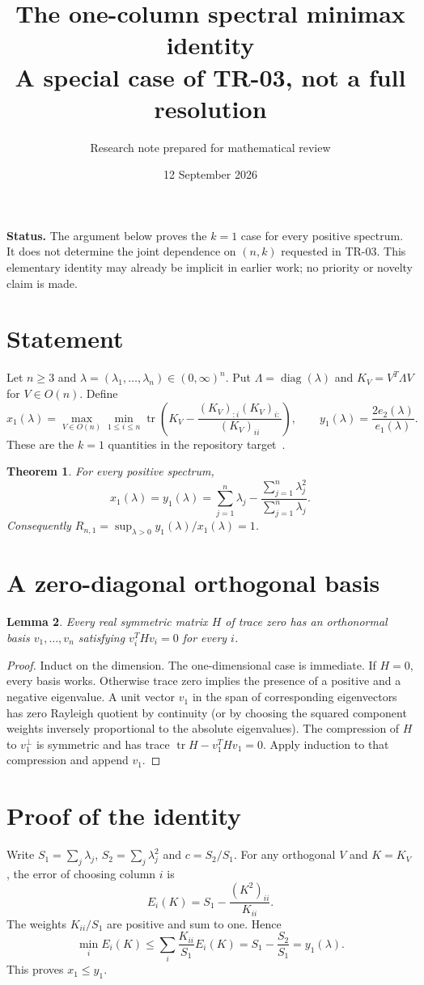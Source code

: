\documentclass[11pt]{article}
\title{The one-column spectral minimax identity\\[3pt]\large A special case of TR-03, not a full resolution}
\author{Research note prepared for mathematical review}
\date{12 September 2026}
\newtheorem{theorem}{Theorem}
\newtheorem{lemma}[theorem]{Lemma}
\newcommand{\tr}{\operatorname{tr}}
\newcommand{\diag}{\operatorname{diag}}
\begin{document}
\maketitle
\noindent\textbf{Status.} The argument below proves the $k=1$ case for every positive spectrum. It does not determine the joint dependence on $(n,k)$ requested in TR-03. This elementary identity may already be implicit in earlier work; no priority or novelty claim is made.

\section{Statement}
Let $n\ge3$ and $\lambda=(\lambda_1,\ldots,\lambda_n)\in(0,\infty)^n$. Put $\Lambda=\diag(\lambda)$ and $K_V=V^T\Lambda V$ for $V\in O(n)$. Define
\[
 x_1(\lambda)=\max_{V\in O(n)}\min_{1\le i\le n}
 \tr\left(K_V-\frac{(K_V)_{:i}(K_V)_{i:}}{(K_V)_{ii}}\right),
 \qquad y_1(\lambda)=\frac{2e_2(\lambda)}{e_1(\lambda)}.
\]
These are the $k=1$ quantities in the repository target~\cite{repo}.
\begin{theorem}
For every positive spectrum,
\[
 x_1(\lambda)=y_1(\lambda)
 =\sum_{j=1}^n\lambda_j-
   \frac{\sum_{j=1}^n\lambda_j^2}{\sum_{j=1}^n\lambda_j}.
\]
Consequently $R_{n,1}=\sup_{\lambda>0}y_1(\lambda)/x_1(\lambda)=1$.
\end{theorem}

\section{A zero-diagonal orthogonal basis}
\begin{lemma}
Every real symmetric matrix $H$ of trace zero has an orthonormal basis $v_1,\ldots,v_n$ satisfying $v_i^THv_i=0$ for every $i$.
\end{lemma}
\begin{proof}
Induct on the dimension. The one-dimensional case is immediate. If $H=0$, every basis works. Otherwise trace zero implies the presence of a positive and a negative eigenvalue. A unit vector $v_1$ in the span of corresponding eigenvectors has zero Rayleigh quotient by continuity (or by choosing the squared component weights inversely proportional to the absolute eigenvalues). The compression of $H$ to $v_1^\perp$ is symmetric and has trace $\tr H-v_1^THv_1=0$. Apply induction to that compression and append $v_1$.
\end{proof}

\section{Proof of the identity}
Write $S_1=\sum_j\lambda_j$, $S_2=\sum_j\lambda_j^2$ and $c=S_2/S_1$. For any orthogonal $V$ and $K=K_V$, the error of choosing column $i$ is
\[
 E_i(K)=S_1-\frac{(K^2)_{ii}}{K_{ii}}.
\]
The weights $K_{ii}/S_1$ are positive and sum to one. Hence
\[
 \min_i E_i(K)\le
 \sum_i\frac{K_{ii}}{S_1}E_i(K)
 =S_1-\frac{S_2}{S_1}=y_1(\lambda).
\]
This proves $x_1\le y_1$.
\end{document}
